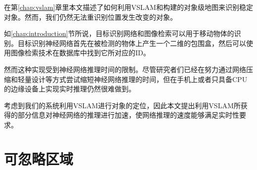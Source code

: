   
  
  


在第\ref{chap:vslam}章里本文描述了如何利用VSLAM和构建的对象级地图来识别稳定对象。然而，我们仍然无法重识别位置发生改变的对象。

如\ref{chap:introduction}节所说，目标识别网络和图像检索可以用于移动物体的识别。目标识别神经网络首先在被检测的物体上产生一个二维的包围盒，然后可以使用图像检索技术在数据库中找到它所对应的ID。

然而这种实现受到神经网络推理时间的限制。尽管研究者们已经在努力通过网络压缩和轻量设计等方式尝试缩短神经网络推理的时间，但在手机上或者只具备CPU的边缘设备上实现实时推理仍然很难做到。

考虑到我们的系统利用VSLAM进行对象的定位，因此本文提出利用VSLAM所获得的部分信息对神经网络的推理进行加速，使网络推理的速度能够满足实时性要求。

\section{可忽略区域}

